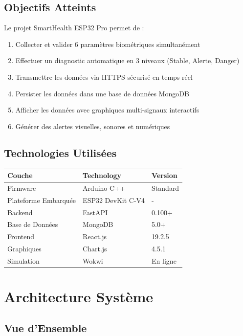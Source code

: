 \documentclass[12pt,french]{report}
\begin{document}
\section{Objectifs Atteints}

Le projet SmartHealth ESP32 Pro permet de :

\begin{enumerate}
    \item Collecter et valider 6 paramètres biométriques simultanément
    \item Effectuer un diagnostic automatique en 3 niveaux (Stable, Alerte, Danger)
    \item Transmettre les données via HTTPS sécurisé en temps réel
    \item Persister les données dans une base de données MongoDB
    \item Afficher les données avec graphiques multi-signaux interactifs
    \item Générer des alertes visuelles, sonores et numériques
\end{enumerate}

\section{Technologies Utilisées}

\begin{table}[h]
\centering
\begin{tabular}{|l|l|l|}
\hline
\textbf{Couche} & \textbf{Technology} & \textbf{Version} \\
\hline
Firmware & Arduino C++ & Standard \\
Plateforme Embarquée & ESP32 DevKit C-V4 & - \\
Backend & FastAPI & 0.100+ \\
Base de Données & MongoDB & 5.0+ \\
Frontend & React.js & 19.2.5 \\
Graphiques & Chart.js & 4.5.1 \\
Simulation & Wokwi & En ligne \\
\hline
\end{tabular}
\end{table}

\chapter{Architecture Système}

\section{Vue d'Ensemble}
\end{document}
